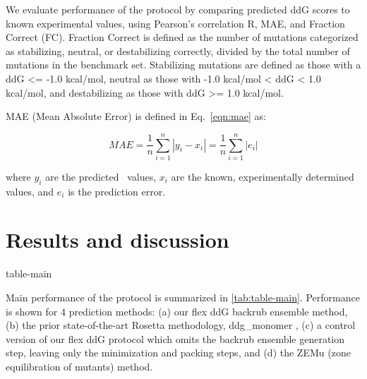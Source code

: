 We evaluate performance of the protocol by comparing predicted ddG scores to known experimental values, using Pearson's correlation R, MAE, and Fraction Correct (FC). Fraction Correct is defined as the number of mutations categorized as stabilizing, neutral, or destabilizing correctly, divided by the total number of mutations in the benchmark set. Stabilizing mutations are defined as those with a ddG <= -1.0 kcal/mol, neutral as those with -1.0 kcal/mol < ddG < 1.0 kcal/mol, and destabilizing as those with ddG >= 1.0 kcal/mol.

MAE (Mean Absolute Error) is defined in Eq.~\ref{eqn:mae} as:

\begin{equation}\label{eqn:mae}
  MAE = \dfrac{1}{n}\sum\limits_{i=1}^n|y_i-x_i| = \dfrac{1}{n}\sum\limits_{i=1}^n|e_i|
\end{equation}

where $y_i$ are the predicted \ddg\ values, $x_i$ are the known, experimentally determined values, and $e_i$ is the prediction error.

\section{Results and discussion}

{table-main}

Main performance of the protocol is summarized in \cref{tab:table-main}. Performance is shown for 4 prediction methods: (a) our flex ddG backrub ensemble method, (b) the prior state-of-the-art Rosetta methodology, ddg\_monomer \cite{kellogg_role_2011}, (c) a control version of our flex ddG protocol which omits the backrub ensemble generation step, leaving only the minimization and packing steps, and (d) the ZEMu (zone equilibration of mutants) method\cite{dourado_multiscale_2014}.

